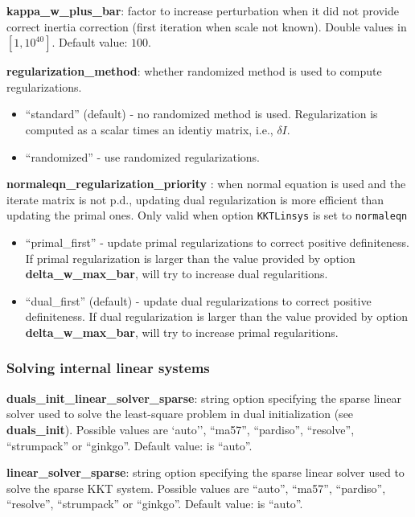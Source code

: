 \noindent \textbf{kappa\_w\_plus\_bar}: factor to increase perturbation when it did not provide correct inertia correction (first iteration when scale not known). Double values in $[1, 10^{40}]$. Default value: $100$.
\medskip

\noindent \textbf{regularization\_method}: whether randomized method is used to compute regularizations.
\begin{itemize}
\item ``standard'' (default) - no randomized method is used. Regularization is computed as a scalar times an identiy matrix, i.e., $\delta I$.
\item ``randomized'' - use randomized regularizations.
\end{itemize}
\medskip

\noindent \textbf{normaleqn\_regularization\_priority }: when normal equation is used and the iterate matrix is not p.d., updating dual regularization is more efficient than updating the primal ones. Only valid when option \texttt{KKTLinsys} is set to \texttt{normaleqn}
\begin{itemize}
\item ``primal\_first'' - update primal regularizations to correct positive definiteness. If primal regularization is larger than the value provided by option \textbf{delta\_w\_max\_bar}, \Hi will try to increase dual regularitions. 
\item ``dual\_first'' (default) - update dual regularizations to correct positive definiteness. If dual regularization is larger than the value provided by option \textbf{delta\_w\_max\_bar}, \Hi will try to increase primal regularitions. 
\end{itemize}
\medskip



\subsubsection{Solving internal linear systems}

\noindent \textbf{duals\_init\_linear\_solver\_sparse}: string option specifying the sparse linear solver used to solve the least-square problem in dual initialization (see \textbf{duals\_init}). Possible values are `auto'', ``ma57'', ``pardiso'', ``resolve'', ``strumpack'' or ``ginkgo''. Default value: is ``auto''.
\medskip

\noindent \textbf{linear\_solver\_sparse}: string option specifying the sparse linear solver used to solve the sparse KKT system. Possible values are ``auto'', ``ma57'', ``pardiso'', ``resolve'', ``strumpack'' or ``ginkgo''. Default value: is ``auto''.
\medskip

